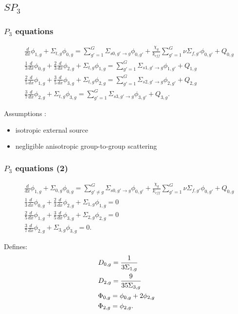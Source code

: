 \subsection{$SP_3$}
\begin{frame}
\frametitle{$P_3$ equations}

\begin{align}
    & \frac{d}{dx} \phi_{1,g} + \Sigma_{t,g} \phi_{0,g} = \sum_{g'=1}^G \Sigma_{s0,g' \rightarrow g} \phi_{0,g'} + \frac{\chi_g}{k_{eff}} \sum_{g'=1}^G \nu\Sigma_{f,g'} \phi_{0,g'} + Q_{0,g}  \label{eq:SP3-0} \\
    & \frac{1}{3} \frac{d}{dx} \phi_{0,g} + \frac{2}{3}\frac{d}{dx}\phi_{2,g} + \Sigma_{t,g} \phi_{1,g} = \sum_{g'=1}^G \Sigma_{s1,g' \rightarrow g} \phi_{1,g'} + Q_{1,g} \label{eq:SP3-1} \\
    & \frac{2}{5} \frac{d}{dx}\phi_{1,g} + \frac{3}{5}\frac{d}{dx}\phi_{3,g} + \Sigma_{t,g} \phi_{2,g} = \sum_{g'=1}^G \Sigma_{s2,g' \rightarrow g} \phi_{2,g'} + Q_{2,g} \label{eq:SP3-2} \\
    & \frac{3}{7}\frac{d}{dx}\phi_{2,g} + \Sigma_{t,g} \phi_{3,g} = \sum_{g'=1}^G \Sigma_{s3,g' \rightarrow g} \phi_{3,g'} + Q_{3,g}. \label{eq:P3-3}
\end{align}

\vspace{0.7cm}
Assumptions \cite{brantley_simplifiedP3_2000}:
\begin{itemize}
	\item isotropic external source
	\item negligible anisotropic group-to-group scattering
\end{itemize}
\end{frame}


\begin{frame}
\frametitle{$P_3$ equations (2)}

\begin{align}
    & \frac{d}{dx} \phi_{1,g} + \Sigma_{0,g} \phi_{0,g} = \sum_{g'\ne g}^G \Sigma_{s0,g' \rightarrow g} \phi_{0,g'} + \frac{\chi_g}{k_{eff}} \sum_{g'=1}^G \nu\Sigma_{f,g'} \phi_{0,g'} + Q_{0,g}  \label{eq:SP3-0b} \\
    & \frac{1}{3} \frac{d}{dx} \phi_{0,g} + \frac{2}{3}\frac{d}{dx}\phi_{2,g} + \Sigma_{1,g} \phi_{1,g} = 0  \label{eq:SP3-1b} \\
    & \frac{2}{5} \frac{d}{dx}\phi_{1,g} + \frac{3}{5}\frac{d}{dx}\phi_{3,g} + \Sigma_{2,g} \phi_{2,g} = 0  \label{eq:SP3-2b} \\
    & \frac{3}{7}\frac{d}{dx}\phi_{2,g} + \Sigma_{3,g} \phi_{3,g} = 0. \label{eq:SP3-3b}
\end{align}

Defines:
\begin{align}
    & D_{0,g} = \frac{1}{3 \Sigma_{1,g}} \notag \\
    & D_{2,g} = \frac{9}{35 \Sigma_{3,g}} \notag \\
    & \Phi_{0,g} = \phi_{0,g} + 2 \phi_{2,g} \notag \\
    & \Phi_{2,g} = \phi_{2,g}. \notag
\end{align}
\end{frame}


